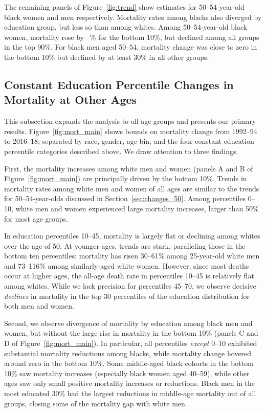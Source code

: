 \documentclass[12pt,letterpaper]{article}
\numberwithin{equation}{section}
\begin{document}
The remaining panels of Figure~\ref{fig:trend} show estimates for 50--54-year-old black women and men respectively. Mortality rates among blacks also diverged by education group, but less so than among whites. Among 50--54-year-old black women, mortality rose by \lbtotalsexchangelesshsblackfemalemiddle--\ubtotalsexchangelesshsblackfemalemiddle\% for the bottom 10\%, but declined among all groups in the top 90\%. For black men aged 50--54, mortality change was close to zero in the bottom 10\% but declined by at least 30\% in all other groups.

\subsection{Constant Education Percentile Changes in Mortality at Other Ages}
\label{sec:all_ages}

This subsection expands the analysis to all age groups and presents our primary results. Figure~\ref{fig:mort_main} shows bounds on mortality change from 1992--94 to 2016--18, separated by race, gender, age bin, and the four constant education percentile categories described above. We draw attention to three findings.

First, the mortality increases among white men and women (panels A and B of Figure~\ref{fig:mort_main}) are principally driven by the bottom 10\%. Trends in mortality rates among white men and women of all ages are similar to the trends for 50--54-year-olds discussed in Section~\ref{sec:changes_50}. Among percentiles 0--10, white men and women experienced large mortality increases, larger than 50\% for most age groups.

In education percentiles 10--45, mortality is largely flat or declining among whites over the age of 50. At younger ages, trends are stark, paralleling those in the bottom ten percentiles: mortality has risen 30--61\% among 25-year-old white men and 73--116\% among similarly-aged white women. However, since most deaths occur at higher ages, the all-age death rate in percentiles 10--45 is relatively flat among whites. While we lack precision for percentiles 45--70, we observe decisive \textit{declines} in mortality in the top 30 percentiles of the education distribution for both men and women.

Second, we observe divergence of mortality by education among black men and women, but without the large rise in mortality in the bottom 10\% (panels C and D of Figure~\ref{fig:mort_main}). In particular, all percentiles \textit{except} 0--10 exhibited substantial mortality reductions among blacks, while mortality change hovered around zero in the bottom 10\%. Some middle-aged black cohorts in the bottom 10\% saw mortality increases (especially black women aged 40--59), while other ages saw only small positive mortality increases or reductions. Black men in the most educated 30\% had the largest reductions in middle-age mortality out of all groups, closing some of the mortality gap with white men.
\end{document}
